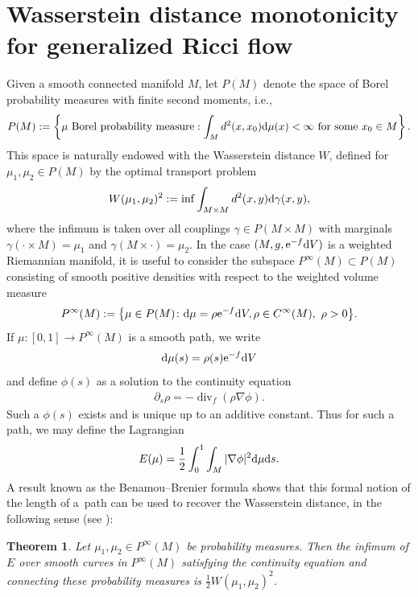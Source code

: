 \documentclass[pdftex]{sigma}
\numberwithin{equation}{section}
\newtheorem{thm}{Theorem}[section]
\newcommand{\del}{\partial}
\newcommand{\N}{\nabla}
\DeclareMathOperator{\divg}{div}
\begin{document}
\section{Wasserstein distance monotonicity for generalized Ricci flow}

Given a smooth connected manifold $M$, let $P(M)$ denote the space of Borel probability measures with finite second moments, i.e.,
\begin{align*}
 P(M):=\left\{\mu \text{ Borel probability measure}: \int_Md^2(x,x_0) {\rm d}\mu(x)<\infty \text{ for some }x_0\in M\right\}.
\end{align*} This space is naturally endowed with the Wasserstein distance $W$, defined for $\mu_1,\mu_2\in P(M)$ by the optimal transport problem
\begin{align*}
 W(\mu_1,\mu_2)^2:=\inf\int_{M\times M}d^2(x,y) {\rm d}\gamma(x,y),
\end{align*}
where the infimum is taken over all couplings $\gamma\in P(M\times M)$ with marginals $\gamma(\cdot\times M)=\mu_1$ and $\gamma(M\times \cdot)=\mu_2$. In the case $(M, g, {\rm e}^{-f} {\rm d}V)$ is a weighted Riemannian manifold, it is useful to consider the subspace $P^\infty(M)\subset P(M)$ consisting of smooth positive densities with respect to the weighted volume measure
\begin{align*}
 P^\infty(M):=\bigl\{\mu\in P(M)\colon {\rm d}\mu=\rho {\rm e}^{-f} {\rm d}V, \rho\in C^\infty(M),\ \rho>0\bigr\}.
\end{align*}
If $\mu\colon[0,1]\to P^\infty(M)$ is a smooth path, we write
\begin{align*}
 {\rm d}\mu(s)=\rho(s) {\rm e}^{-f} {\rm d}V
\end{align*}
and define $\phi(s)$ as a solution to the continuity equation
\begin{align}\label{eq: conteqstatic}
 \del_s\rho=-\divg_f(\rho\N\phi).
\end{align}
Such a $\phi(s)$ exists and is unique up to an additive constant.
Thus for such a path, we may define the Lagrangian
\begin{align*}
 E(\mu)=\frac12\int_0^1\int_M |\N\phi|^2 {\rm d}\mu {\rm d}s.
\end{align*}
A result known as the Benamou--Brenier formula shows that this formal notion of the length of a~path can be used to recover the Wasserstein distance, in the following sense (see \cite[Proposition~4.3]{OW05}):
\begin{thm}\label{thm: existence}
Let $\mu_1,\mu_2\in P^\infty(M)$ be probability measures. Then the infimum of $E$ over smooth curves in $P^\infty(M)$ satisfying the continuity equation and connecting these probability measures is $\frac12 W(\mu_1,\mu_2)^2$.
\end{thm}
\end{document}
